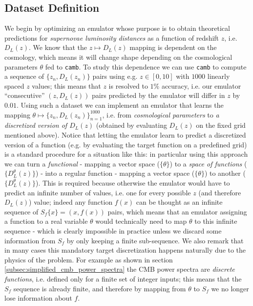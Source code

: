 \subsection{Dataset Definition}\label{subsec:supernova_example_dataset_definition}
We begin by optimizing an emulator whose purpose is to obtain theoretical predictions for \emph{supernovae luminosity distances} as a function of redshift $z$, i.e. $D_L(z)$. 
We know that the $z\mapsto D_L(z)$ mapping is dependent on the cosmology, which means it will change shape depending on the cosmological parameters $\theta$ fed to \texttt{camb}. To study this dependence we can use \texttt{camb} to compute a sequence of $\{z_n, D_L(z_n)\}$ pairs using e.g. $z\in [0, 10]$ with $1000$ linearly spaced $z$ values; this means that $z$ is resolved to $1\%$ accuracy, i.e. our emulator ``consecutive'' $(z, D_L(z))$ pairs predicted by the emulator will differ in $z$ by $0.01$. Using such a dataset we can implement an emulator that learns the mapping $\theta\mapsto \{z_n, D_L(z_n)\}_{n=1}^{1000}$, i.e. from \emph{cosmological parameters} to \emph{a discretized version of $D_L(z)$} (obtained by evaluating $D_L(z)$ on the fixed grid mentioned above).
Notice that letting the emulator learn to predict a discretized version of a function (e.g. by evaluating the target function on a predefined grid) is a standard procedure for a situation like this: in particular using this approach we can turn a \emph{functional} - mapping a vector space ($\{\theta\}$) to a \emph{space of functions} ($\{D_L^{\theta}(z)\}$) - into a regular function - mapping a vector space ($\{\theta\}$) to another ($\{D_L^{\theta}(z)\}$). This is required because otherwise the emulator would have to predict an infinite number of values, i.e. one for every possible $z$ (and therefore $D_L(z)$) value; indeed any function $f(x)$ can be thought as an infinite sequence of $S_f\{x\} = (x, f(x))$ pairs, which means that an emulator assigning a function to a real variable $\theta$ would technically need to map $\theta$ to this infinite sequence - which is clearly impossible in practice unless we discard some information from $S_f$ by only keeping a finite sub-sequence.
We also remark that in many cases this mandatory target discretization happens naturally due to the physics of the problem. For example as shown in section \ref{subsec:simplified_cmb_power_spectra} the CMB power spectra are \emph{discrete functions}, i.e. defined only for a finite set of integer inputs; this means that the $S_f$ sequence is already finite, and therefore by mapping from $\theta$ to $S_f$ we no longer lose information about $f$.

